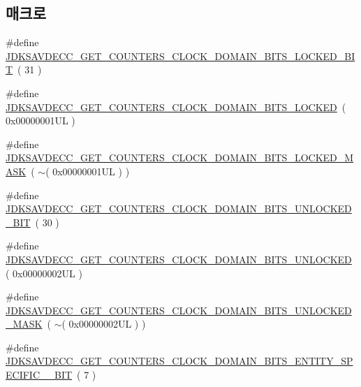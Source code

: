 \subsection*{매크로}
\begin{DoxyCompactItemize}
\item 
\#define \hyperlink{group__get__counters__clock__domain__bits_ga67637c50d2b65e63b674ca5475462339}{J\+D\+K\+S\+A\+V\+D\+E\+C\+C\+\_\+\+G\+E\+T\+\_\+\+C\+O\+U\+N\+T\+E\+R\+S\+\_\+\+C\+L\+O\+C\+K\+\_\+\+D\+O\+M\+A\+I\+N\+\_\+\+B\+I\+T\+S\+\_\+\+L\+O\+C\+K\+E\+D\+\_\+\+B\+IT}~( 31 )
\item 
\#define \hyperlink{group__get__counters__clock__domain__bits_ga798c2a4491d898a2b69aece4ebc90144}{J\+D\+K\+S\+A\+V\+D\+E\+C\+C\+\_\+\+G\+E\+T\+\_\+\+C\+O\+U\+N\+T\+E\+R\+S\+\_\+\+C\+L\+O\+C\+K\+\_\+\+D\+O\+M\+A\+I\+N\+\_\+\+B\+I\+T\+S\+\_\+\+L\+O\+C\+K\+ED}~( 0x00000001\+U\+L )
\item 
\#define \hyperlink{group__get__counters__clock__domain__bits_gaa408b77262f3af45dced4611bc790102}{J\+D\+K\+S\+A\+V\+D\+E\+C\+C\+\_\+\+G\+E\+T\+\_\+\+C\+O\+U\+N\+T\+E\+R\+S\+\_\+\+C\+L\+O\+C\+K\+\_\+\+D\+O\+M\+A\+I\+N\+\_\+\+B\+I\+T\+S\+\_\+\+L\+O\+C\+K\+E\+D\+\_\+\+M\+A\+SK}~( $\sim$( 0x00000001\+U\+L ) )
\item 
\#define \hyperlink{group__get__counters__clock__domain__bits_gaa1dbd29cf3a53fb38fff17a57ad3990e}{J\+D\+K\+S\+A\+V\+D\+E\+C\+C\+\_\+\+G\+E\+T\+\_\+\+C\+O\+U\+N\+T\+E\+R\+S\+\_\+\+C\+L\+O\+C\+K\+\_\+\+D\+O\+M\+A\+I\+N\+\_\+\+B\+I\+T\+S\+\_\+\+U\+N\+L\+O\+C\+K\+E\+D\+\_\+\+B\+IT}~( 30 )
\item 
\#define \hyperlink{group__get__counters__clock__domain__bits_gab82c3d68f42a5999c1b06bee7b472097}{J\+D\+K\+S\+A\+V\+D\+E\+C\+C\+\_\+\+G\+E\+T\+\_\+\+C\+O\+U\+N\+T\+E\+R\+S\+\_\+\+C\+L\+O\+C\+K\+\_\+\+D\+O\+M\+A\+I\+N\+\_\+\+B\+I\+T\+S\+\_\+\+U\+N\+L\+O\+C\+K\+ED}~( 0x00000002\+U\+L )
\item 
\#define \hyperlink{group__get__counters__clock__domain__bits_gaa24682605fe030d700ddae34a1819724}{J\+D\+K\+S\+A\+V\+D\+E\+C\+C\+\_\+\+G\+E\+T\+\_\+\+C\+O\+U\+N\+T\+E\+R\+S\+\_\+\+C\+L\+O\+C\+K\+\_\+\+D\+O\+M\+A\+I\+N\+\_\+\+B\+I\+T\+S\+\_\+\+U\+N\+L\+O\+C\+K\+E\+D\+\_\+\+M\+A\+SK}~( $\sim$( 0x00000002\+U\+L ) )
\item 
\#define \hyperlink{group__get__counters__clock__domain__bits_ga218fd3ac3e46af652479d7d0ad6892b9}{J\+D\+K\+S\+A\+V\+D\+E\+C\+C\+\_\+\+G\+E\+T\+\_\+\+C\+O\+U\+N\+T\+E\+R\+S\+\_\+\+C\+L\+O\+C\+K\+\_\+\+D\+O\+M\+A\+I\+N\+\_\+\+B\+I\+T\+S\+\_\+\+E\+N\+T\+I\+T\+Y\+\_\+\+S\+P\+E\+C\+I\+F\+I\+C\+\_\+\_\+\+B\+IT}~( 7 )

\end{DoxyCompactItemize}
